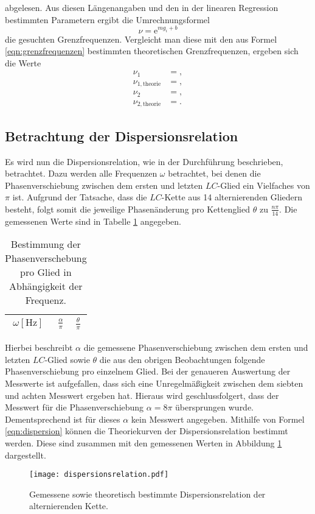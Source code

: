 abgelesen.
Aus diesen Längenangaben und den in der linearen Regression bestimmten Parametern ergibt die Umrechnungsformel
\begin{equation}
  \nu = \mathrm{e}^{m g_i + b}
\end{equation}
die gesuchten Grenzfrequenzen.
Vergleicht man diese mit den aus Formel \ref{eqn:grenzfrequenzen} bestimmten theoretischen Grenzfrequenzen, ergeben sich die Werte
\begin{align*}
  \nu_{1} &= , \\
  \nu_{1, \text{theorie}} &= , \\
  \nu_{2} &= , \\
  \nu_{2, \text{theorie}} &= .
\end{align*}


\subsection{Betrachtung der Dispersionsrelation}
\label{sec:dis}
Es wird nun die Dispersionsrelation, wie in der Durchführung beschrieben, betrachtet.
Dazu werden alle Frequenzen $\omega$ betrachtet, bei denen die Phasenverschiebung zwischen dem ersten und letzten $LC$-Glied ein Vielfaches von $\pi$ ist.
Aufgrund der Tatsache, dass die $LC$-Kette aus 14 alternierenden Gliedern besteht, folgt somit die jeweilige Phasenänderung pro Kettenglied $\theta$ zu $\frac{n \pi}{14}$.
Die gemessenen Werte sind in Tabelle \ref{tab:dispersion} angegeben.
\begin{table}
  \centering
  \caption{Bestimmung der Phasenverschebung pro Glied in Abhängigkeit der Frequenz.}
  \label{tab:dispersion}
  \begin{tabular}{c c c}
    \toprule
    {$\omega [\si{\hertz}]$} & {$\frac{\alpha}{\pi} $} & {$\frac{\theta}{\pi} $}\\
    \midrule
    
    \bottomrule
  \end{tabular}
\end{table}
Hierbei beschreibt $\alpha$ die gemessene Phasenverschiebung zwischen dem ersten und letzten $LC$-Glied sowie $\theta$ die aus den obrigen Beobachtungen folgende Phasenverschiebung pro einzelnem Glied.
Bei der genaueren Auswertung der Messwerte ist aufgefallen, dass sich eine Unregelmäßigkeit zwischen dem siebten und achten Messwert ergeben hat.
Hieraus wird geschlussfolgert, dass der Messwert für die Phasenverschiebung $\alpha = 8 \pi$ übersprungen wurde.
Dementsprechend ist für dieses $\alpha$ kein Messwert angegeben.
Mithilfe von Formel \ref{eqn:dispersion} können die Theoriekurven der Dispersionsrelation bestimmt werden.
Diese sind zusammen mit den gemessenen Werten in Abbildung \ref{fig:dispersion_fertig} dargestellt.
\begin{figure}[H]
  \centering
  \texttt{[image: dispersionsrelation.pdf]}
  \caption{Gemessene sowie theoretisch bestimmte Dispersionsrelation der alternierenden Kette.}
  \label{fig:dispersion_fertig}
\end{figure}

